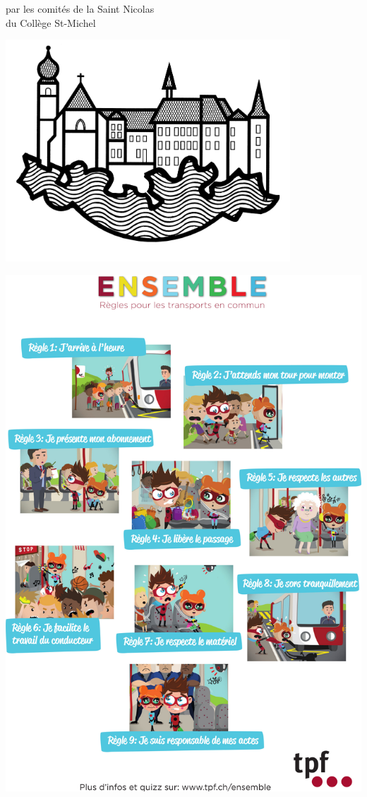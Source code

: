 \begin{center}
{\Huge par les comités de la Saint Nicolas\vspace*{1mm}\\
du Collège St-Michel}
\vspace*{5mm}
\par
\includegraphics[width=0.8\textwidth]{csm.jpg}
\end{center}


\clearpage
\thispagestyle{empty}%
{\centering
\includegraphics[width=.96\textwidth]{ensemble.jpg}
\par
}
\clearpage
